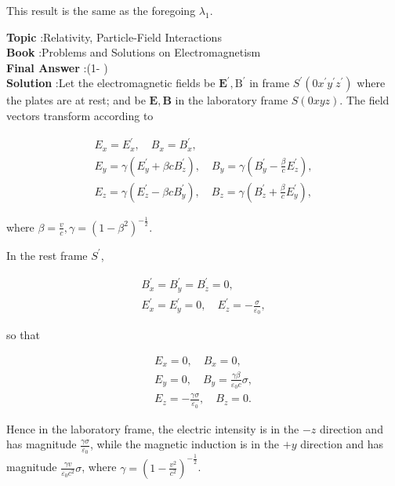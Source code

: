 \documentclass[10pt]{article}
\begin{document}
This result is the same as the foregoing $\lambda_{1}$. 

\textbf{Topic} :Relativity, Particle-Field Interactions\\
\textbf{Book} :Problems and Solutions on Electromagnetism\\
\textbf{Final Answer} :\left(1- \cos \theta\right)\\


\textbf{Solution} :Let the electromagnetic fields be $\mathbf{E}^{\prime}, \mathrm{B}^{\prime}$ in frame $S^{\prime}\left(0 x^{\prime} y^{\prime} z^{\prime}\right)$ where the plates are at rest; and be $\mathbf{E}, \mathbf{B}$ in the laboratory frame $S(0 x y z)$. The field vectors transform according to

$$
\begin{gathered}
E_{x}=E_{x}^{\prime}, \quad B_{x}=B_{x}^{\prime}, \\
E_{y}=\gamma\left(E_{y}^{\prime}+\beta c B_{z}^{\prime}\right), \quad B_{y}=\gamma\left(B_{y}^{\prime}-\frac{\beta}{c} E_{z}^{\prime}\right), \\
E_{z}=\gamma\left(E_{z}^{\prime}-\beta c B_{y}^{\prime}\right), \quad B_{z}=\gamma\left(B_{z}^{\prime}+\frac{\beta}{c} E_{y}^{\prime}\right),
\end{gathered}
$$

where $\beta=\frac{v}{c}, \gamma=\left(1-\beta^{2}\right)^{-\frac{1}{2}}$.

In the rest frame $S^{\prime}$,

$$
\begin{gathered}
B_{x}^{\prime}=B_{y}^{\prime}=B_{z}^{\prime}=0, \\
E_{x}^{\prime}=E_{y}^{\prime}=0, \quad E_{z}^{\prime}=-\frac{\sigma}{\varepsilon_{0}},
\end{gathered}
$$

so that

$$
\begin{gathered}
E_{x}=0, \quad B_{x}=0, \\
E_{y}=0, \quad B_{y}=\frac{\gamma \beta}{\varepsilon_{0} c} \sigma, \\
E_{z}=-\frac{\gamma \sigma}{\varepsilon_{0}}, \quad B_{z}=0 .
\end{gathered}
$$

Hence in the laboratory frame, the electric intensity is in the $-z$ direction and has magnitude $\frac{\gamma \sigma}{\varepsilon_{0}}$, while the magnetic induction is in the $+y$ direction and has magnitude $\frac{\gamma v}{\varepsilon_{0} c^{2}} \sigma$, where $\gamma=\left(1-\frac{v^{2}}{c^{2}}\right)^{-\frac{1}{2}}$.
\end{document}
